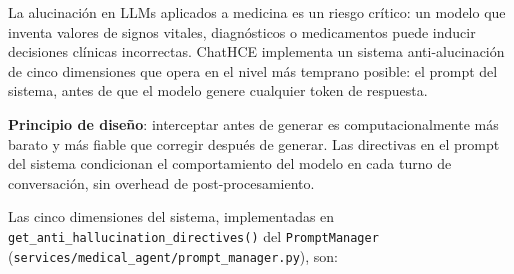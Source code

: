 \begin{tcolorbox}[
  enhanced, breakable,
  colback=accent!3, colframe=accent!40,
  title={\footnotesize\sffamily\bfseries\color{white} Sistema Anti-Alucinación — Diseño y Justificación},
  attach boxed title to top left={yshift=-2mm, xshift=4mm},
  boxed title style={colback=accent!55, rounded corners},
  left=5pt, right=5pt, top=5pt, bottom=5pt
]
\footnotesize
La alucinación en LLMs aplicados a medicina es un riesgo crítico: un modelo que inventa valores de signos vitales, diagnósticos o medicamentos puede inducir decisiones clínicas incorrectas. ChatHCE implementa un sistema anti-alucinación de cinco dimensiones que opera en el nivel más temprano posible: el prompt del sistema, antes de que el modelo genere cualquier token de respuesta.

\textbf{Principio de diseño}: interceptar antes de generar es computacionalmente más barato y más fiable que corregir después de generar. Las directivas en el prompt del sistema condicionan el comportamiento del modelo en cada turno de conversación, sin overhead de post-procesamiento.

Las cinco dimensiones del sistema, implementadas en \texttt{get\_anti\_hallucination\_directives()} del \texttt{PromptManager} (\texttt{services/medical\_agent/prompt\_manager.py}), son:


\end{tcolorbox}
